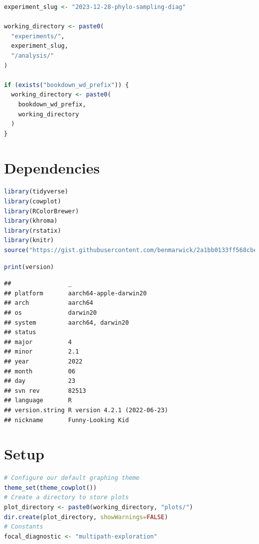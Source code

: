 \documentclass[
]{book}
\begin{document}
\begin{lstlisting}[language=R]
experiment_slug <- "2023-12-28-phylo-sampling-diag"

working_directory <- paste0(
  "experiments/",
  experiment_slug,
  "/analysis/"
)

if (exists("bookdown_wd_prefix")) {
  working_directory <- paste0(
    bookdown_wd_prefix,
    working_directory
  )
}
\end{lstlisting}

\hypertarget{dependencies-2}{%
\section{Dependencies}\label{dependencies-2}}

\begin{lstlisting}[language=R]
library(tidyverse)
library(cowplot)
library(RColorBrewer)
library(khroma)
library(rstatix)
library(knitr)
source("https://gist.githubusercontent.com/benmarwick/2a1bb0133ff568cbe28d/raw/fb53bd97121f7f9ce947837ef1a4c65a73bffb3f/geom_flat_violin.R")
\end{lstlisting}

\begin{lstlisting}[language=R]
print(version)
\end{lstlisting}

\begin{lstlisting}
##                _                           
## platform       aarch64-apple-darwin20      
## arch           aarch64                     
## os             darwin20                    
## system         aarch64, darwin20           
## status                                     
## major          4                           
## minor          2.1                         
## year           2022                        
## month          06                          
## day            23                          
## svn rev        82513                       
## language       R                           
## version.string R version 4.2.1 (2022-06-23)
## nickname       Funny-Looking Kid
\end{lstlisting}

\hypertarget{setup-2}{%
\section{Setup}\label{setup-2}}

\begin{lstlisting}[language=R]
# Configure our default graphing theme
theme_set(theme_cowplot())
# Create a directory to store plots
plot_directory <- paste0(working_directory, "plots/")
dir.create(plot_directory, showWarnings=FALSE)
# Constants
focal_diagnostic <- "multipath-exploration"
\end{lstlisting}
\end{document}
